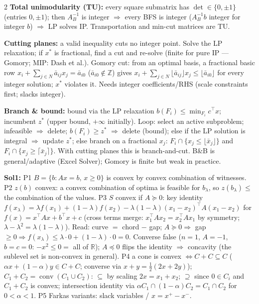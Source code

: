 \documentclass{article}
\newcommand{\sect}[1]{\par\vspace{1.2pt}{\fontsize{8}{9.2}\selectfont\textbf{#1}}\par\vspace{0.2pt}}
\newcommand{\kw}[1]{\textbf{#1}}
\begin{document}
\begin{multicols}{2}
\kw{Total unimodularity (TU):} every square submatrix has $\det\in\{0,\pm 1\}$ (entries $0,\pm 1$); then $A_B^{-1}$ is integer $\Rightarrow$ every BFS is integer ($A_B^{-1}b$ integer for integer $b$) $\Rightarrow$ LP solves IP. Transportation and min-cut matrices are TU.

\kw{Cutting planes:} a valid inequality cuts no integer point. Solve the LP relaxation; if $x^*$ is fractional, find a cut and re-solve (finite for pure IP --- Gomory; MIP: Dash et al.). Gomory cut: from an optimal basis, a fractional basic row $x_i+\sum_{j\in N}\bar a_{ij}x_j=\bar a_{i0}$ ($\bar a_{i0}\notin\mathbb{Z}$) gives $x_i+\sum_{j\in N}\lfloor\bar a_{ij}\rfloor x_j\le\lfloor\bar a_{i0}\rfloor$ for every integer solution; $x^*$ violates it. Needs integer coefficients/RHS (scale constraints first; slacks integer).

\kw{Branch \& bound:} bound via the LP relaxation $b(F_i)\le\min_{F_i}c^\top x$; incumbent $z^*$ (upper bound, $+\infty$ initially). Loop: select an active subproblem; infeasible $\Rightarrow$ delete; $b(F_i)\ge z^*$ $\Rightarrow$ delete (bound); else if the LP solution is integral $\Rightarrow$ update $z^*$; else branch on a fractional $x_j$: $F_i\cap\{x_j\le\lfloor\bar x_j\rfloor\}$ and $F_i\cap\{x_j\ge\lceil\bar x_j\rceil\}$. With cutting planes this is branch-and-cut. B\&B is general/adaptive (Excel Solver); Gomory is finite but weak in practice.

\sect{7. HW Proof Sketches}
\kw{Sol1:} P1 $B=\{b:Ax=b,\,x\ge 0\}$ is convex by convex combination of witnesses. P2 $z(b)$ convex: a convex combination of optima is feasible for $b_\lambda$, so $z(b_\lambda)\le$ the combination of the values. P3 $S$ convex if $A\succeq 0$: key identity $f(x_\lambda)=\lambda f(x_1)+(1-\lambda)f(x_2)-\lambda(1-\lambda)(x_1-x_2)^\top A(x_1-x_2)$ for $f(x)=x^\top Ax+b^\top x+c$ (cross terms merge: $x_1^\top Ax_2=x_2^\top Ax_1$ by symmetry; $\lambda-\lambda^2=\lambda(1-\lambda)$). Read: curve $=$ chord $-$ gap; $A\succeq 0\Rightarrow$ gap $\ge 0\Rightarrow f(x_\lambda)\le\lambda\cdot 0+(1-\lambda)\cdot 0=0$. Converse false ($n=1$, $A=-1$, $b=c=0$: $-x^2\le 0=$ all of $\mathbb{R}$); $A\preceq 0$ flips the identity $\Rightarrow$ concavity (the sublevel set is non-convex in general). P4 a cone is convex $\Leftrightarrow C+C\subseteq C$ ($\alpha x+(1-\alpha)y\in C+C$; converse via $x+y=\tfrac12(2x+2y)$); $C_1+C_2=\operatorname{conv}(C_1\cup C_2)$: $\subseteq$ by scaling $2x=x_1+x_2$; $\supseteq$ since $0\in C_i$ and $C_1+C_2$ is convex; intersection identity via $\alpha C_1\cap(1-\alpha)C_2=C_1\cap C_2$ for $0<\alpha<1$. P5 Farkas variants: slack variables / $x=x^+-x^-$.


\end{multicols}
\end{document}
